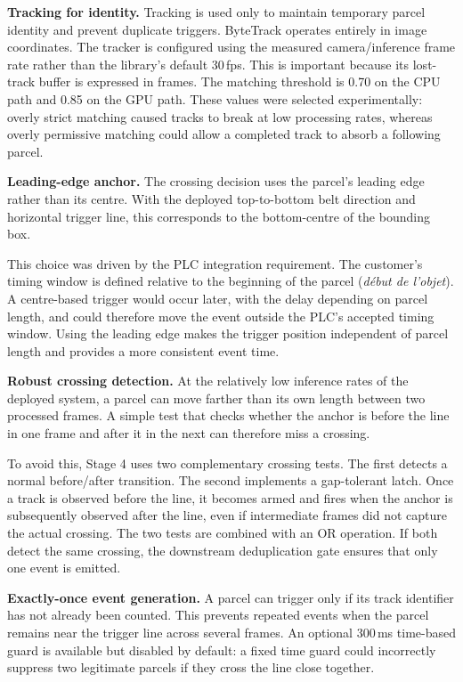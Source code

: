 \documentclass[9pt,a4paper,twocolumn]{rho-class/rho}
\begin{document}
\textbf{Tracking for identity.} Tracking is used only to maintain temporary parcel identity and prevent duplicate triggers. ByteTrack operates entirely in image coordinates. The tracker is configured using the measured camera/inference frame rate rather than the library's default 30\,fps. This is important because its lost-track buffer is expressed in frames. The matching threshold is 0.70 on the CPU path and 0.85 on the GPU path. These values were selected experimentally: overly strict matching caused tracks to break at low processing rates, whereas overly permissive matching could allow a completed track to absorb a following parcel.

\textbf{Leading-edge anchor.} The crossing decision uses the parcel's leading edge rather than its centre. With the deployed top-to-bottom belt direction and horizontal trigger line, this corresponds to the bottom-centre of the bounding box.

This choice was driven by the PLC integration requirement. The customer's timing window is defined relative to the beginning of the parcel (\emph{d\'ebut de l'objet}). A centre-based trigger would occur later, with the delay depending on parcel length, and could therefore move the event outside the PLC's accepted timing window. Using the leading edge makes the trigger position independent of parcel length and provides a more consistent event time.

\textbf{Robust crossing detection.} At the relatively low inference rates of the deployed system, a parcel can move farther than its own length between two processed frames. A simple test that checks whether the anchor is before the line in one frame and after it in the next can therefore miss a crossing.

To avoid this, Stage 4 uses two complementary crossing tests. The first detects a normal before/after transition. The second implements a gap-tolerant latch. Once a track is observed before the line, it becomes armed and fires when the anchor is subsequently observed after the line, even if intermediate frames did not capture the actual crossing. The two tests are combined with an OR operation. If both detect the same crossing, the downstream deduplication gate ensures that only one event is emitted.

\textbf{Exactly-once event generation.} A parcel can trigger only if its track identifier has not already been counted. This prevents repeated events when the parcel remains near the trigger line across several frames. An optional 300\,ms time-based guard is available but disabled by default: a fixed time guard could incorrectly suppress two legitimate parcels if they cross the line close together.
\end{document}
